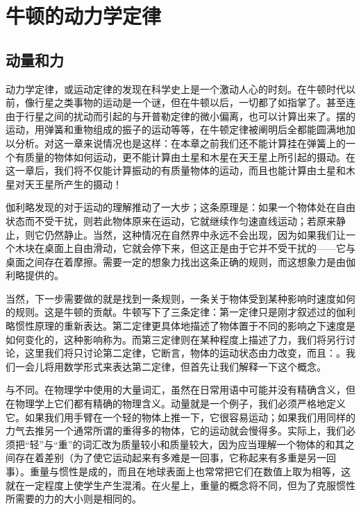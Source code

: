 \documentclass[12pt,oneside]{book}
\begin{document}
\chapter{牛顿的动力学定律}
\section{动量和力}
动力学定律，或运动定律的发现在科学史上是一个激动人心的时刻。在牛顿时代以前，像行星之类事物的运动是一个谜，但在牛顿以后，一切都了如指掌了。甚至连由于行星之间的扰动而引起的与开普勒定律的微小偏离，也可以计算出来了。摆的运动，用弹簧和重物组成的振子的运动等等，在牛顿定律被阐明后全都能圆满地加以分析。对这一章来说情况也是这样：在本章之前我们还不能计算挂在弹簧上的一个有质量的物体如何运动，更不能计算由土星和木星在天王星上所引起的摄动。在这一章后，我们将不仅能计算振动的有质量物体的运动，而且也能计算由土星和木星对天王星所产生的摄动！

伽利略发现的对于运动的理解推动了一大步；这条原理是：如果一个物体处在自由状态而不受干扰，则若此物体原来在运动，它就继续作匀速直线运动；若原来静止，则它仍然静止。当然，这种情况在自然界中永远不会出现，因为如果我们让一个木块在桌面上自由滑动，它就会停下来，但这正是由于它并不受干扰的——它与桌面之间存在着摩擦。需要一定的想象力找出这条正确的规则，而这想象力是由伽利略提供的。

当然，下一步需要做的就是找到一条规则，一条关于物体受到某种影响时速度如何的规则。这是牛顿的贡献。牛顿写下了三条定律：第一定律只是刚才叙述过的伽利略惯性原理的重新表达。第二定律更具体地描述了物体置于不同的影响之下速度是如何变化的，这种影响称为。而第三定律则在某种程度上描述了力，我们将另行讨论，这里我们将只讨论第二定律，它断言，物体的运动状态由力改变，而且：。我们一会儿将用数学形式来表达第二定律，但首先让我们解释一下这个概念。

与不同。在物理学中使用的大量词汇，虽然在日常用语中可能并没有精确含义，但在物理学上它们都有精确的物理含义。动量就是一个例子，我们必须严格地定义它。如果我们用手臂在一个轻的物体上推一下，它很容易运动；如果我们用同样的力气去推另一个通常所谓的重得多的物体，它的运动就会慢得多。实际上，我们必须把“轻”与“重”的词汇改为质量较小和质量较大，因为应当理解一个物体的和其之间存在着差别（为了使它运动起来有多难是一回事，它称起来有多重是另一回事）。重量与惯性是成的，而且在地球表面上也常常把它们在数值上取为相等，这就在一定程度上使学生产生混淆。在火星上，重量的概念将不同，但为了克服惯性所需要的力的大小则是相同的。
\end{document}
